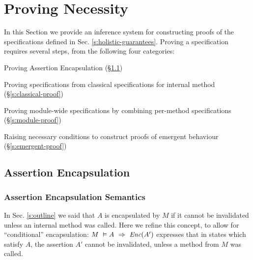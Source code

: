 \section{Proving Necessity}
\label{s:inference}

In this Section we provide an inference system for constructing 
proofs of the \Nec specifications defined in Sec. \ref{s:holistic-guarantees}.
Proving a specification requires several steps, from the following four
categories:
\begin{description} 
\item
Proving Assertion Encapsulation (\S \ref{s:encaps-proof})
\item
Proving \Nec specifications from classical specifications for  internal method (\S \ref{s:classical-proof})
\item
Proving module-wide  \Nec specifications by combining per-method \Nec specifications (\S \ref{s:module-proof})
\item
Raising necessary conditions to construct proofs of emergent behaviour (\S \ref{s:emergent-proof})
\end{description}

\subsection {Assertion Encapsulation}
\label{s:encaps-proof}



\subsubsection{Assertion Encapsulation Semantics}

In Sec. \ref{s:outline} we said that   $A$ is encapsulated by  $M$ if it cannot be invalidated unless an
internal method was called. 
Here we refine this concept, to allow for ``conditional'' encapsulation:
$M\ \vDash A\ \Rightarrow\ \textit{Enc}(A')$ expresses that in states which satisfy $A$, the assertion 
$A'$ cannot be invalidated, unless a method from $M$ was called.

